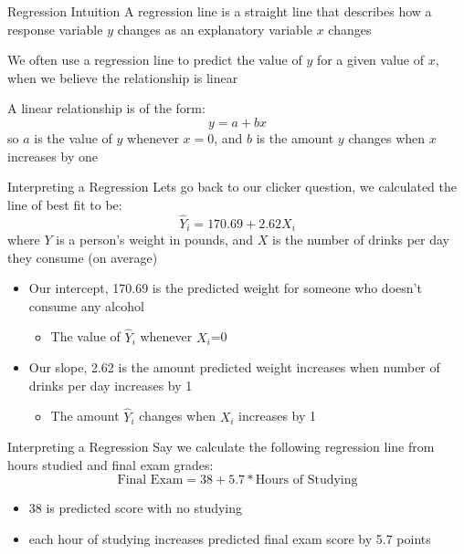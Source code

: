 \documentclass{beamer}
\begin{document}
\begin{frame}{Regression Intuition}
	A regression line is a straight line that describes how a response variable $y$ changes as an explanatory variable $x$ changes
	
	We often use a regression line to predict the value of $y$ for a given value of $x$, when we believe the relationship is linear
	
	A linear relationship is of the form:
	$$y=a+b x$$
	so $a$ is the value of $y$ whenever $x=0$, and $b$ is the amount $y$ changes when $x$ increases by one
\end{frame}

\begin{frame}{Interpreting a Regression}
	Lets go back to our clicker question, we calculated the line of best fit to be:
	$$ \hat{Y}_i=170.69+2.62X_i$$
	where $Y$ is a person's weight in pounds, and $X$ is the number of drinks per day they consume (on average)
	
	\begin{itemize}
		\item Our intercept, 170.69 is the predicted weight for someone who doesn't consume any alcohol 
		      \begin{itemize} 
		      	\item The value of $\hat{Y}_i$ whenever $X_i$=0
		      \end{itemize}
		      
		\item Our slope, 2.62 is the amount predicted weight increases when number of drinks per day increases by 1
		      \begin{itemize}
		      	\item The amount $\hat{Y}_i$ changes when $X_i$ increases by 1
		      \end{itemize}
	\end{itemize}
\end{frame}

\frame

\begin{frame}{Interpreting a Regression}
	Say we calculate the following regression line from hours studied and final exam grades:
	$$\text{Final Exam}=38 + 5.7*\text{Hours of Studying}$$
	\begin{itemize}
		\item 38 is predicted score with no studying
		\item each hour of studying increases predicted final exam score by 5.7 points
	\end{itemize}
\end{frame}
\end{document}
